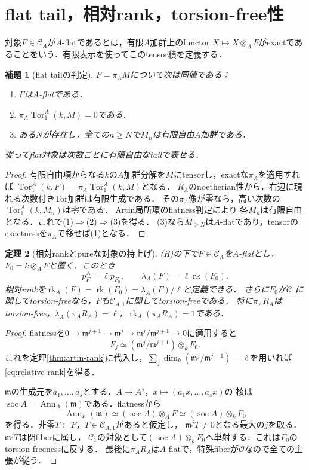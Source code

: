 \documentclass[11pt,a4paper]{ltjsarticle}
\newtheorem{theorem}{定理}[section]
\newtheorem{lemma}[theorem]{補題}
\theoremstyle{definition}
\newcommand{\OO}{\mathcal O}
\newcommand{\CC}{\mathcal C}
\newcommand{\mm}{\mathfrak m}
\newcommand{\Tor}{\operatorname{Tor}}
\newcommand{\rk}{\operatorname{rk}}
\newcommand{\soc}{\operatorname{soc}}
\begin{document}
\section{flat tail，相対rank，torsion-free性}\label{sec:flat}
対象$F\in\CC_A$が$A$-flatであるとは，有限$A$加群上のfunctor
$X\mapsto X\otimes_AF$がexactであることをいう．有限表示を使ってこのtensor積を定義する．

\begin{lemma}[flat tailの判定]\label{lem:flat-tail}
$F=\pi_A M$について次は同値である：
\begin{enumerate}
\item $F$は$A$-flatである．
\item $\pi_A\Tor_1^A(k,M)=0$である．
\item ある$N$が存在し，全ての$n\geq N$で$M_n$は有限自由$A$加群である．
\end{enumerate}
従ってflat対象は次数ごとに有限自由なtailで表せる．
\end{lemma}
\begin{proof}
有限自由項からなる$k$の$A$加群分解を$M$にtensorし，exactな$\pi_A$を適用すれば
$\Tor_1^A(k,F)=\pi_A\Tor_1^A(k,M)$となる．
$R_A$のnoetherian性から，右辺に現れる次数付きTor加群は有限生成である．
その$\pi_A$像が零なら，高い次数の$\Tor_1^A(k,M_n)$は零である．
Artin局所環のflatness判定\cite[Tag 051E, Lemmas 10.101.2--10.101.3]{Stacks}により
各$M_n$は有限自由となる．これで(1)$\Rightarrow$(2)$\Rightarrow$(3)を得る．
(3)なら$M_{\geq N}$は$A$-flatであり，tensorのexactnessを$\pi_A$で移せば(1)となる．
\end{proof}

\begin{theorem}[相対rankとpureな対象の持上げ]\label{thm:relative-rank}
\textup{(H)}の下で$F\in\CC_A$を$A$-flatとし，$F_0=k\otimes_AF$と置く．このとき
\begin{equation}\label{eq:relative-rank}
 p_F^A=\ell p_{F_0},\qquad
 \lambda_A(F)=\ell\rk(F_0).
\end{equation}
相対rankを$\rk_A(F)=\rk(F_0)=\lambda_A(F)/\ell$と定義できる．
さらに$F_0$が$\CC_1$に関してtorsion-freeなら，$F$も$\CC_{A,1}$に関してtorsion-freeである．
特に$\pi_A R_A$はtorsion-free，$\lambda_A(\pi_A R_A)=\ell$，$\rk_A(\pi_A R_A)=1$である．
\end{theorem}
\begin{proof}
flatnessを$0\to\mm^{j+1}\to\mm^j\to\mm^j/\mm^{j+1}\to0$に適用すると
\[
 F_j\simeq(\mm^j/\mm^{j+1})\otimes_kF_0.
\]
これを定理\ref{thm:artin-rank}に代入し，$\sum_j\dim_k(\mm^j/\mm^{j+1})=\ell$を用いれば
\eqref{eq:relative-rank}を得る．

$\mm$の生成元を$a_1,\ldots,a_s$とする．$A\to A^s$，$x\mapsto(a_1x,\ldots,a_sx)$の
核は$\soc A=\operatorname{Ann}_A(\mm)$である．flatnessから
\[
 \operatorname{Ann}_F(\mm)
 \simeq(\soc A)\otimes_AF
 \simeq(\soc A)\otimes_kF_0
\]
を得る．非零$T\subset F$，$T\in\CC_{A,1}$があると仮定し，
$\mm^jT\ne0$となる最大の$j$を取る．$\mm^jT$は閉fiberに属し，
$\CC_1$の対象として$(\soc A)\otimes_kF_0$へ単射する．これは$F_0$のtorsion-freenessに反する．
最後に$\pi_A R_A$は$A$-flatで，特殊fiberが$\OO$なので全ての主張が従う．
\end{proof}
\end{document}
